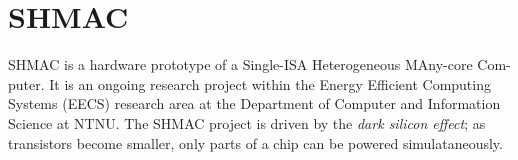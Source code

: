 \section{SHMAC}

SHMAC is a hardware prototype of a Single-ISA Heterogeneous MAny-core Com-
puter. It is an ongoing research project within the Energy Efficient Computing
Systems (EECS) research area at the Department of Computer and Information
Science at NTNU. The SHMAC project is driven by the \textit{dark silicon
effect}; as transistors become smaller, only parts of a chip can be powered
simulataneously.

